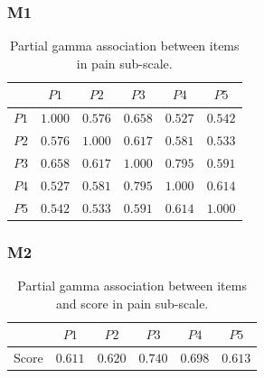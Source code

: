 \subsubsection{M1}
\begin{table}[H]
    \centering
    \begin{tabular}{c | c c c c c}
            & $P1$ & $P2$ & $P3$ & $P4$ & $P5$\\
            \hline 
        $P1$ & $1.000$ & $0.576$ & $0.658$ & $0.527$ & $0.542$ \\
        $P2$ & $0.576$ & $1.000$ & $0.617$ & $0.581$ & $0.533$ \\
        $P3$ & $0.658$ & $0.617$ & $1.000$ & $0.795$ & $0.591$ \\
        $P4$ & $0.527$ & $0.581$ & $0.795$ & $1.000$ & $0.614$ \\
        $P5$ & $0.542$ & $0.533$ & $0.591$ & $0.614$ & $1.000$ \\
         \hline    
    \end{tabular}
    \caption{Partial gamma association between items in pain sub-scale.}
    \label{tab:M1_pain}
\end{table}

\subsubsection{M2}
\begin{table}[H]
    \centering
    \begin{tabular}{c|c c c c c }
    & $P1$ & $P2$ & $P3$ & $P4$ & $P5$\\
            \hline 
    Score & $0.611$ & $0.620$ & $0.740$ & $0.698$ &  $0.613$ \\
    \hline 
    \end{tabular}
    \caption{Partial gamma association between items and score in pain sub-scale.}
    \label{tab:M2_pain}
\end{table}

